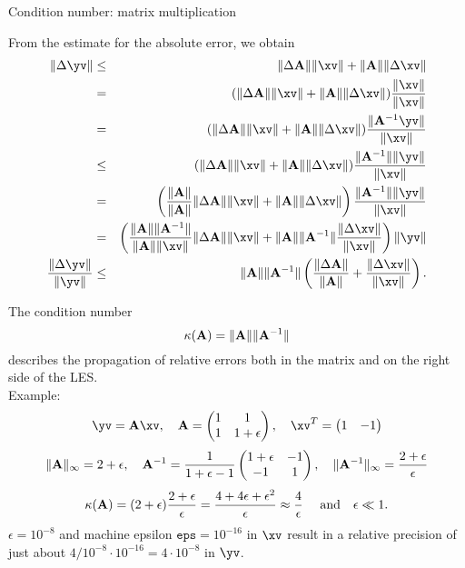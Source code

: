 \begin{vbframe}{Condition number: matrix multiplication}
\framebreak

From the estimate for the absolute error, we obtain
\small
\begin{eqnarray*}
\|\Delta \yv\| &\leq& \|\Delta \Amat\|\|\xv\| +
  \|\Amat\|\|\Delta \xv\| \\
&=& (\|\Delta \Amat\|\|\xv\| +
  \|\Amat\|\|\Delta \xv\|) \frac{\|\xv\|}{\|\xv\|} \\
&=& (\|\Delta \Amat\|\|\xv\| +
  \|\Amat\|\|\Delta \xv\|) \frac{\|\Amat^{-1}\yv\|}{\|\xv\|} \\
&\leq& (\|\Delta \Amat\|\|\xv\| +
  \|\Amat\|\|\Delta \xv\|) \frac{\|\Amat^{-1}\|\|\yv\|}{\|\xv\|} \\
&=& \left(\frac{\|\Amat\|}{\|\Amat\|}\|\Delta \Amat\|\|\xv\| +
  \|\Amat\|\|\Delta \xv\|\right) \frac{\|\Amat^{-1}\|\|\yv\|}{\|\xv\|} \\
&=& \left(\frac{\|\Amat\|\|\Amat^{-1}\|}{\|\Amat\|\|\xv\|}\|\Delta \Amat\|\|\xv\| +
  \|\Amat\|\|\Amat^{-1}\|\frac{\|\Delta \xv\|}{\|\xv\|}\right) \|\yv\| \\
\frac{\|\Delta \yv\|}{\|\yv\|} &\leq& \|\Amat\|\|\Amat^{-1}\|
  \left(\frac{\|\Delta \Amat\|}{\|\Amat\|} + \frac{\|\Delta \xv\|}{\|\xv\|} \right).
\end{eqnarray*}

\framebreak

The condition number
$$
\kappa(\mathbf{A}) = \|\mathbf{A}\|\|\mathbf{A}^{-1}\|
$$
describes the propagation of relative errors both in the matrix and on the right side of the LES.\\
\medskip
Example:
$$
\yv = \Amat \xv, \quad \Amat =
\mat{1 & 1 \\ 1 & 1 + \epsilon}, \quad \xv^T = \mat{ 1 & -1 }
$$
$$
\|\mathbf{A}\|_{\infty} = 2 + \epsilon, \quad \mathbf{A}^{-1} = \frac{1}{1 + \epsilon - 1}
\begin{pmatrix}  1 + \epsilon & -1 \\ -1 & 1 \end{pmatrix}, \quad \|\mathbf{A}^{-1}\|_\infty = \frac{2 + \epsilon}{\epsilon}
$$
$$
\kappa(\mathbf{A}) = (2 + \epsilon)\frac{2 + \epsilon}{\epsilon} =
  \frac{4 + 4\epsilon + \epsilon^2}{\epsilon} \approx \frac{4}{\epsilon} \quad
  \text{ and}\quad \epsilon \ll 1.
$$
$\epsilon = 10^{-8}$ and machine epsilon $\texttt{eps} = 10^{-16}$ in $\xv$ result in
a relative precision of just about $4 / 10^{-8} \cdot 10^{-16} = 4 \cdot 10^{-8}$ in
$\yv$.
\end{vbframe}



